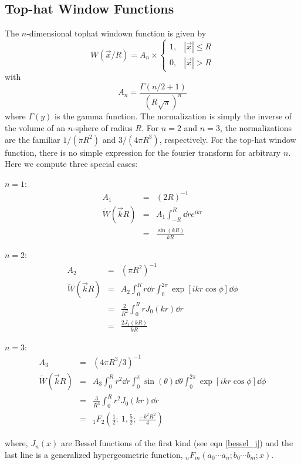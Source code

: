 \subsection{Top-hat Window Functions}
The $n$-dimensional tophat windown function is given by
\begin{equation}
W(\vec x/R) = A_n
\times\left\{
\begin{array}{ll}
  1, & |\vec x|\le R\\
  0, & |\vec x|>R
\end{array}
\right.
\end{equation}
with
\begin{equation}
  A_n = \frac{\Gamma(n/2+1)}{(R\sqrt\pi)^n}
\end{equation}
where $\Gamma(y)$ is the gamma function.  The normalization is simply the
inverse of the volume of an $n$-sphere of radius $R$.   
For $n=2$ and $n=3$, the normalizations are the familiar 
$1/(\pi R^2)$ and $3/(4\pi R^3)$, respectively.
For the top-hat window function, there is no
simple expression for the fourier transform for arbitrary $n$. 
Here we compute three special cases:
\begin{description}
  \item{$n=1$}:
    \begin{eqnarray}
      \label{tophat1D}
      A_1 &=& (2R)^{-1}\nonumber\\
      \widetilde W(\vec k R) &=& A_1\int_{-R}^{R}\dd r e^{ikr} \nonumber\\
      &=&\frac{\sin(kR)}{kR}
    \end{eqnarray}
  \item{$n=2$}:
    \begin{eqnarray}
      \label{tophat2D}
      A_2 &=& (\pi R^2)^{-1}\nonumber\\
      \widetilde W(\vec k R) &=& A_2\int_0^R r\dd r\int_0^{2\pi} \exp[ikr\cos\phi]\dd\phi\nonumber\\
      &=& \frac{2}{R^2}\int_0^R r J_0(kr)\dd r \nonumber\\
      &=& \frac{2J_1(kR)}{kR}
    \end{eqnarray}
  \item{$n=3$}: 
    \begin{eqnarray}
      \label{tophat3D}
      A_3 &=& (4\pi R^3/3)^{-1}\nonumber\\
      \widetilde W(\vec k R) &=& A_3\int_0^Rr^2\dd r\int_0^\pi \sin(\theta)\dd\theta\int_0^{2\pi}\exp[ikr\cos\phi]\dd\phi\nonumber\\
      &=& \frac{3}{R^3}\int_0^R r^2 J_0(kr)\dd r\nonumber\\
      &=& _1F_2(\frac{1}{2};\ 1,\frac{5}{2};\ \frac{-k^2R^2}{4})
    \end{eqnarray}
\end{description}
where, $J_n(x)$ are Bessel functions of the first kind (see eqn \ref{bessel_j})
and the last line is a generalized hypergeometric function, 
$_nF_m(a_0\cdots a_n;b_0\cdots b_m;x)$.  
